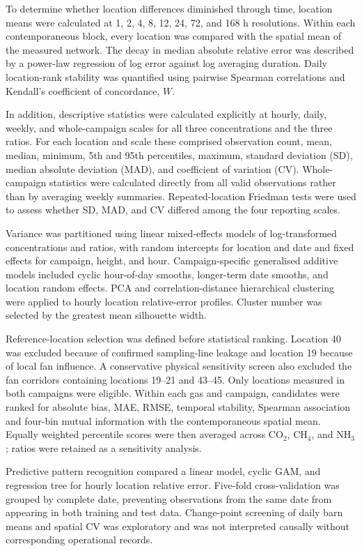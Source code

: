 \documentclass[12pt,a4paper]{article}
\begin{document}
To determine whether location differences diminished through time, location
means were calculated at 1, 2, 4, 8, 12, 24, 72, and 168 h resolutions. Within
each contemporaneous block, every location was compared with the spatial mean
of the measured network. The decay in median absolute relative error was
described by a power-law regression of log error against log averaging
duration. Daily location-rank stability was quantified using pairwise Spearman
correlations and Kendall's coefficient of concordance, \(W\).

In addition, descriptive statistics were calculated explicitly at hourly,
daily, weekly, and whole-campaign scales for all three concentrations and the
three ratios. For each location and scale these comprised observation count,
mean, median, minimum, 5th and 95th percentiles, maximum, standard deviation
(SD), median absolute deviation (MAD), and coefficient of variation (CV).
Whole-campaign statistics were calculated directly from all valid observations
rather than by averaging weekly summaries. Repeated-location Friedman tests
were used to assess whether SD, MAD, and CV differed among the four reporting
scales.

Variance was partitioned using linear mixed-effects models of log-transformed
concentrations and ratios, with random intercepts for location and date and
fixed effects for campaign, height, and hour. Campaign-specific generalised
additive models included cyclic hour-of-day smooths, longer-term date smooths,
and location random effects. PCA and correlation-distance hierarchical
clustering were applied to hourly location relative-error profiles. Cluster
number was selected by the greatest mean silhouette width.

Reference-location selection was defined before statistical ranking. Location
40 was excluded because of confirmed sampling-line leakage and location 19
because of local fan influence. A conservative physical sensitivity screen
also excluded the fan corridors containing locations 19--21 and 43--45. Only
locations measured in both campaigns were eligible. Within each gas and
campaign, candidates were ranked for absolute bias, MAE, RMSE, temporal
stability, Spearman association and four-bin mutual information with the
contemporaneous spatial mean. Equally weighted percentile scores were then
averaged across \(\mathrm{CO_2}\), \(\mathrm{CH_4}\), and
\(\mathrm{NH_3}\); ratios were retained as a sensitivity analysis.

Predictive pattern recognition compared a linear model, cyclic GAM, and
regression tree for hourly location relative error. Five-fold cross-validation
was grouped by complete date, preventing observations from the same date from
appearing in both training and test data. Change-point screening of daily barn
means and spatial CV was exploratory and was not interpreted causally without
corresponding operational records.
\end{document}
